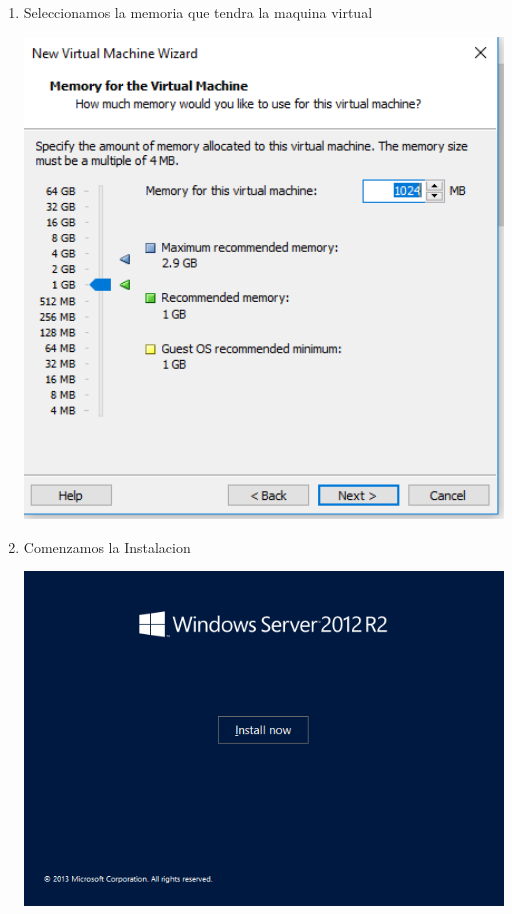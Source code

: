 \begin{enumerate}[1.]
	\item Seleccionamos la memoria que tendra la maquina virtual

	\begin{center}
	\includegraphics[width=15cm]{./Imagenes/img5server} 
	\end{center}
	
	\item Comenzamos la Instalacion

	\begin{center}
	\includegraphics[width=15cm]{./Imagenes/img6server} 
	\end{center}



\end{enumerate}
